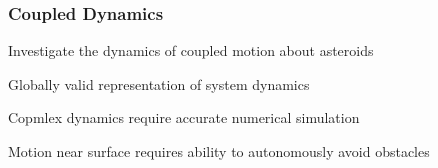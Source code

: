 
\begin{frame}[t]\frametitle{Coupled Dynamics}
    Investigate the dynamics of coupled motion about asteroids

    Globally valid representation of system dynamics

    Copmlex dynamics require accurate numerical simulation

    Motion near surface requires ability to autonomously avoid obstacles
\end{frame}